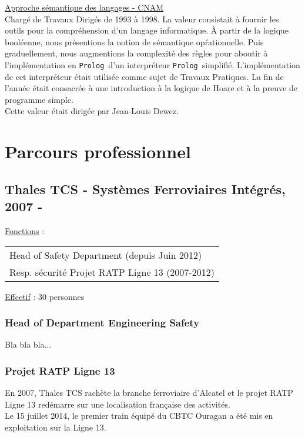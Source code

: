 \documentclass[a4paper,12pt]{article}
\newcommand{\Prolog}{{\tt Prolog}}
\newcommand{\smallspace}{\vspace{0.25cm}}
\begin{document}
\smallspace
\hspace{-0.6cm}\underline{Approche s\'emantique des langages - CNAM}
\\
Charg\'e de Travaux Dirig\'es de 1993 \`a 1998. La valeur consistait \`a
fournir les outils pour la compr\'ehension d'un langage informatique.
\`A partir de la logique bool\'eenne, nous pr\'esentions la notion de
s\'emantique op\'rationnelle. Puis graduellement, nous augmentions la
complexit\'e des r\`egles pour aboutir \`a l'impl\'ementation en
\Prolog\ d'un interpr\'eteur \Prolog\ simplifi\'e. L'impl\'ementation
de cet interpr\'eteur \'etait utilis\'ee comme sujet de Travaux
Pratiques.  La fin de l'ann\'ee \'etait consacr\'ee \`a une
introduction \`a la logique de Hoare et \`a la preuve de programme
simple.
\\
Cette valeur \'etait dirig\'ee par Jean-Louis Dewez.


\newpage
\section{Parcours professionnel}
\subsection{Thales TCS - Syst\`emes Ferroviaires Int\'egr\'es, 2007 - }
\hspace{-0.6cm}\underline{Fonctions} : 
\begin{tabular}{l}
Head of Safety Department (depuis Juin 2012)\\
Resp. s\'ecurit\'e Projet RATP Ligne 13 (2007-2012) \\
\end{tabular}

\hspace{-0.6cm}\underline{Effectif} : 30 personnes
\\
\subsubsection{Head of Department Engineering Safety}
Bla bla bla...

\subsubsection{Projet RATP Ligne 13}
En 2007, Thales TCS rach\`ete la branche ferroviaire d'Alcatel et le
projet RATP Ligne 13 red\'emarre sur une localisation fran\c{c}aise des
activit\'es. 
\\
Le 15 juillet 2014, le premier train \'equip\'e du CBTC Ouragan a
\'et\'e mis en exploitation sur la Ligne 13.
\end{document}
